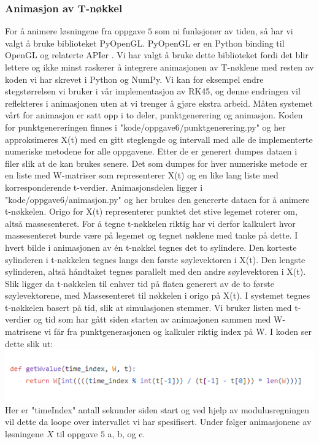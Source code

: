 \subsubsection{Animasjon av T-nøkkel}
For å animere løsningene fra oppgave $5$ som ni funksjoner av tiden, så har vi valgt å bruke biblioteket PyOpenGL. PyOpenGL er en Python binding til OpenGL og relaterte APIer \cite{PYOPENGL:1}. Vi har valgt å bruke dette biblioteket fordi det blir lettere og ikke minst raskerer å integrere animasjonen av T-nøklene med resten av koden vi har skrevet i Python og NumPy. Vi kan for eksempel endre stegstørrelsen vi bruker i vår implementasjon av RK45, og denne endringen vil reflekteres i animasjonen uten at vi trenger å gjøre ekstra arbeid.\newline\newline
Måten systemet vårt for animasjon er satt opp i to deler, punktgenerering og animasjon. Koden for punktgenereringen finnes i "kode/oppgave6/punktgenerering.py" og her approksimeres X(t) med en gitt steglengde og intervall med alle de implementerte numeriske metodene for alle oppgavene. Etter de er generert dumpes dataen i filer slik at de kan brukes senere. Det som dumpes for hver numeriske metode er en liste med W-matriser som representerer X(t) og en like lang liste med korresponderende t-verdier. \newline\newline Animasjonsdelen ligger i "kode/oppgave6/animasjon.py" og her brukes den genererte dataen for å animere t-nøkkelen. Origo for X(t) representerer punktet det stive legemet roterer om, altså massesenteret. For å tegne t-nøkkelen riktig har vi derfor kalkulert hvor massesenteret burde være på legemet og tegnet nøklene med tanke på dette. I hvert bilde i animasjonen av én t-nøkkel tegnes det to sylindere. Den korteste sylinderen i t-nøkkelen tegnes langs den første søylevektoren i X(t). Den lengste sylinderen, altså håndtaket tegnes parallelt med den andre søylevektoren i X(t). Slik ligger da t-nøkkelen til enhver tid på flaten generert av de to første søylevektorene, med Massesenteret til nøkkelen i origo på X(t). I systemet tegnes t-nøkkelen basert på tid, slik at simulasjonen stemmer. Vi bruker listen med t-verdier og tid som har gått siden starten av animasjonen sammen med W-matrisene vi får fra punktgenerasjonen og kalkuler riktig index på W. I koden ser dette slik ut: \newline 
\includegraphics{rapport/resultat/bilder/get_w_value.PNG}
\newline
Her er "timeIndex" antall sekunder siden start og ved hjelp av modulusregningen vil dette da loope over intervallet vi har spesifisert.\newline\newline
Under følger animasjonene av løsningene $X$ til oppgave $5$ a, b, og c.

